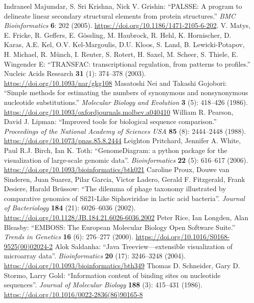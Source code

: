 \documentclass{report}
\begin{document}
\begin{thebibliography}{99}
Indraneel Majumdar, S. Sri Krishna, Nick V. Grishin: ``PALSSE: A program to delineate linear secondary structural elements from protein structures.'' \textit{BMC Bioinformatics} {\bf 6}: 202 (2005). \url{https://doi.org/10.1186/1471-2105-6-202}.
V. Matys, E. Fricke, R. Geffers, E. G\"ossling, M. Haubrock, R. Hehl, K. Hornischer, D. Karas, A.E. Kel, O.V. Kel-Margoulis, D.U. Kloos, S. Land, B. Lewicki-Potapov, H. Michael, R. M\"unch, I. Reuter, S. Rotert, H. Saxel, M. Scheer, S. Thiele, E. Wingender E: ``TRANSFAC: transcriptional regulation, from patterns to profiles.'' Nucleic Acids Research {\bf 31} (1): 374--378 (2003).  \url{https://doi.org/10.1093/nar/gkg108}
Masatoshi Nei and Takashi Gojobori: ``Simple methods for estimating the numbers of synonymous and nonsynonymous nucleotide substitutions.'' \textit{Molecular Biology and Evolution} {\bf 3} (5): 418--426 (1986). \url{https://doi.org/10.1093/oxfordjournals.molbev.a040410}
William R. Pearson, David J. Lipman: ``Improved tools for biological sequence comparison.'' \textit{Proceedings of the National Academy of Sciences USA} {\bf 85} (8): 2444--2448 (1988).
\url{https://doi.org/10.1073/pnas.85.8.2444}
Leighton Pritchard, Jennifer A. White, Paul R.J. Birch, Ian K. Toth: ``GenomeDiagram: a python package for the visualization of large-scale genomic data''. {\it Bioinformatics} {\bf 22} (5): 616--617 (2006).
\url{https://doi.org/10.1093/bioinformatics/btk021}
Caroline Proux, Douwe van Sinderen, Juan Suarez, Pilar Garcia, Victor Ladero, Gerald F. Fitzgerald, Frank Desiere, Harald Br\"ussow:
``The dilemma of phage taxonomy illustrated by comparative genomics of Sfi21-Like Siphoviridae in lactic acid bacteria''. \textit{Journal of Bacteriology} {\bf 184} (21): 6026--6036 (2002).
\url{https://doi.org/10.1128/JB.184.21.6026-6036.2002}
Peter Rice, Ian Longden, Alan Bleasby: ``EMBOSS: The European Molecular Biology Open Software Suite.'' \textit{Trends in Genetics} {\bf 16} (6): 276--277 (2000).
\url{https://doi.org/10.1016/S0168-9525(00)02024-2}
Alok Saldanha: ``Java Treeview---extensible visualization of microarray data''. \textit{Bioinformatics} {\bf 20} (17): 3246--3248 (2004).
\url{https://doi.org/10.1093/bioinformatics/bth349}
Thomas D. Schneider, Gary D. Stormo, Larry Gold: ``Information content of binding sites on nucleotide sequences''. \textit{Journal of Molecular Biology} {\bf 188} (3): 415--431 (1986). \url{https://doi.org/10.1016/0022-2836(86)90165-8}

\end{thebibliography}
\end{document}
